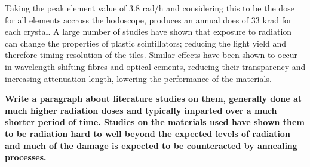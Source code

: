 Taking the peak element value of 3.8 rad/h and considering this to be the dose for all elements accross the hodoscope, produces an annual does of 33 krad for each crystal. A large number of studies have shown that exposure to radiation can change the properties of plastic scintillators; reducing the light yield and therefore timing resolution of the tiles. Similar effects have been shown to occur in wavelength shifting fibres and optical cements, reducing their transparency and increasing attenuation length, lowering the performance of the materials.

\textbf{Write a paragraph about literature studies on them, generally done at much higher radiation doses and typically imparted over a much shorter period of time. Studies on the materials used have shown them to be radiation hard to well beyond the expected levels of radiation and much of the damage is expected to be counteracted by annealing processes.}




\cite{golovko2008use}


